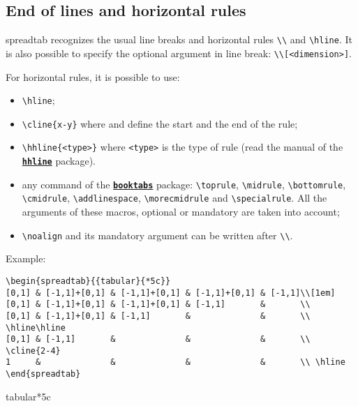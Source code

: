 \documentclass[a4paper,10pt]{article}
\newcommand\verbinline[1][]{\lstinline[breaklines=false,basicstyle=\normalsize\ttfamily,#1]}
\newcommand\ST{\textsf{spreadtab}\xspace}
\newcommand\falseverb[1]{\texttt{\detokenize{#1}}}
\begin{document}
\begin{<table environment>}
\subsection{End of lines and horizontal rules}
\ST recognizes the usual line breaks and horizontal rules \verb|\\| and \verb|\hline|. It is also possible to specify the optional argument in line break: \verb-\\[<dimension>]-.

For horizontal rules, it is possible to use:\par\nobreak
\begin{itemize}
	\item \verb-\hline-;
	\item \verb=\cline{x-y}= where \falseverb x and \falseverb y define the start and the end of the rule;
	\item \verb=\hhline{<type>}= where \verb=<type>= is the type of rule (read the manual of the \href{http://www.ctan.org/tex-archive/macros/latex/required/tools/}{\texttt{\textbf{hhline}}} package).
	\item any command of the \href{http://www.ctan.org/tex-archive/macros/latex/contrib/booktabs/}{\texttt{\textbf{booktabs}}} package: \verb-\toprule-, \verb-\midrule-, \verb-\bottomrule-, \verb-\cmidrule-, \verb-\addlinespace-, \verb-\morecmidrule- and \verb-\specialrule-. All the arguments of these macros, optional or mandatory are taken into account;
	\item \verbinline-\noalign- and its mandatory argument can be written after \verb-\\-.
\end{itemize}
Example:
\begin{lstlisting}
\begin{spreadtab}{{tabular}{*5c}}
[0,1] & [-1,1]+[0,1] & [-1,1]+[0,1] & [-1,1]+[0,1] & [-1,1]\\[1em]
[0,1] & [-1,1]+[0,1] & [-1,1]+[0,1] & [-1,1]       &       \\
[0,1] & [-1,1]+[0,1] & [-1,1]       &              &       \\ \hline\hline
[0,1] & [-1,1]       &              &              &       \\ \cline{2-4}
1     &              &              &              &       \\ \hline
\end{spreadtab}
\end{lstlisting}
\begin{center}
\begin{spreadtab}{{tabular}{*5c}}

\end{spreadtab}
\end{center}
\end{<table environment>}
\end{document}
